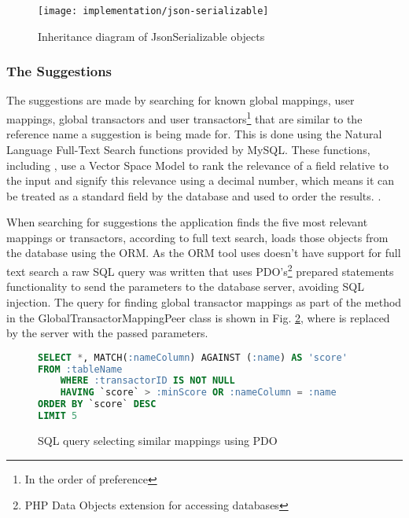 \begin{figure}[h]
    \centering
    \texttt{[image: implementation/json-serializable]}
    \caption{Inheritance diagram of JsonSerializable objects}
    \label{fig:mapping-json-diagram}
    
    \begin{comment}
[<<Interface>> JsonSerializable]^-[<<Abstract>> Transactor]
[<<Interface>> JsonSerializable]^-[<<Abstract>> TransactorMapping]
[<<Interface>> JsonSerializable]^-[Transaction]
[<<Abstract>> TransactorMapping]^-[UserTransactorMapping]
[<<Abstract>> TransactorMapping]^-[GlobalTransactorMapping]
[<<Abstract>> Transactor]^-[UserTransactor]
[<<Abstract>> Transactor]^-[GlobalTransactor]
    \end{comment}
\end{figure}

\subsubsection{The Suggestions} \label{sec:suggestionimplementation}
The suggestions are made by searching for known global mappings, user mappings, global transactors and user transactors\footnote{In the order of preference} that are similar to the reference name a suggestion is being made for. This is done using the Natural Language Full-Text Search functions provided by MySQL. These functions, including , use a Vector Space Model to rank the relevance of a field relative to the input and signify this relevance using a decimal number, which means it can be treated as a standard field by the database and used to order the results.  \parencite{mysql2014searches}. 

When searching for suggestions the application finds the five most relevant mappings or transactors, according to full text search, loads those objects from the database using the ORM. As the ORM tool uses doesn't have support for full text search a raw SQL query was written that uses PDO's\footnote{PHP Data Objects extension for accessing databases} prepared statements functionality to send the parameters to the database server, avoiding SQL injection. The query for finding global transactor mappings as part of the  method in the GlobalTransactorMappingPeer class is shown in Fig. \ref{fig:sql-match-query}, where  is replaced by the server with the passed parameters.

\begin{figure}
\centering
\lstset{style=phpcolor}
\begin{lstlisting}[language=sql]
SELECT *, MATCH(:nameColumn) AGAINST (:name) AS 'score'
FROM :tableName
	WHERE :transactorID IS NOT NULL
	HAVING `score` > :minScore OR :nameColumn = :name
ORDER BY `score` DESC
LIMIT 5
\end{lstlisting}
\caption{SQL query selecting similar mappings using PDO}
\label{fig:sql-match-query}
\end{figure}

